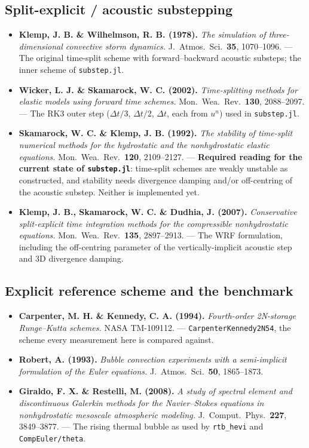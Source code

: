 \documentclass[11pt,a4paper]{article}
\begin{document}
\subsection{Split-explicit / acoustic substepping}
\begin{itemize}
\item \textbf{Klemp, J. B. \& Wilhelmson, R. B. (1978).} \emph{The simulation of
  three-dimensional convective storm dynamics.} J.\ Atmos.\ Sci.\ \textbf{35},
  1070--1096. --- The original time-split scheme with forward--backward
  acoustic substeps; the inner scheme of \texttt{substep.jl}.
\item \textbf{Wicker, L. J. \& Skamarock, W. C. (2002).} \emph{Time-splitting
  methods for elastic models using forward time schemes.} Mon.\ Wea.\ Rev.\
  \textbf{130}, 2088--2097. --- The RK3 outer step ($\Delta t/3$, $\Delta t/2$,
  $\Delta t$, each from $u^n$) used in \texttt{substep.jl}.
\item \textbf{Skamarock, W. C. \& Klemp, J. B. (1992).} \emph{The stability of
  time-split numerical methods for the hydrostatic and the nonhydrostatic
  elastic equations.} Mon.\ Wea.\ Rev.\ \textbf{120}, 2109--2127.
  --- \textbf{Required reading for the current state of \texttt{substep.jl}}:
  time-split schemes are weakly unstable as constructed, and stability needs
  divergence damping and/or off-centring of the acoustic substep. Neither is
  implemented yet.
\item \textbf{Klemp, J. B., Skamarock, W. C. \& Dudhia, J. (2007).}
  \emph{Conservative split-explicit time integration methods for the
  compressible nonhydrostatic equations.} Mon.\ Wea.\ Rev.\ \textbf{135},
  2897--2913. --- The WRF formulation, including the off-centring parameter of
  the vertically-implicit acoustic step and 3D divergence damping.
\end{itemize}

\subsection{Explicit reference scheme and the benchmark}
\begin{itemize}
\item \textbf{Carpenter, M. H. \& Kennedy, C. A. (1994).} \emph{Fourth-order
  2N-storage Runge--Kutta schemes.} NASA TM-109112. ---
  \texttt{CarpenterKennedy2N54}, the scheme every measurement here is compared
  against.
\item \textbf{Robert, A. (1993).} \emph{Bubble convection experiments with a
  semi-implicit formulation of the Euler equations.} J.\ Atmos.\ Sci.\
  \textbf{50}, 1865--1873.
\item \textbf{Giraldo, F. X. \& Restelli, M. (2008).} \emph{A study of spectral
  element and discontinuous Galerkin methods for the Navier--Stokes equations
  in nonhydrostatic mesoscale atmospheric modeling.} J.\ Comput.\ Phys.\
  \textbf{227}, 3849--3877. --- The rising thermal bubble as used by
  \texttt{rtb\_hevi} and \texttt{CompEuler/theta}.
\end{itemize}
\end{document}
